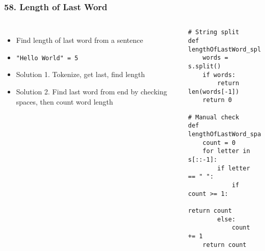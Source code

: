 \begin{frame}[fragile]\frametitle{58. Length of Last Word}

	\begin{columns}[T]
	\begin{itemize}
	\item Find length of last word from a sentence
	\item \lstinline{"Hello World" = 5}
	\item Solution 1. Tokenize, get last, find length
	\item Solution 2. Find last word from end by checking spaces, then count word length
	\end{itemize}
		\begin{lstlisting}[basicstyle=\scriptsize]
# String split
def lengthOfLastWord_split(s):
    words = s.split()
    if words:
        return len(words[-1])
    return 0

# Manual check
def lengthOfLastWord_spaces(s):
    count = 0
    for letter in s[::-1]:
        if letter == " ":
            if count >= 1:
                return count
        else:
            count += 1
    return count

				\end{lstlisting}		

	\end{columns}
		
\end{frame}

